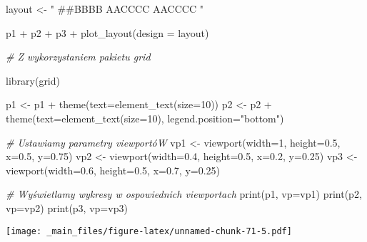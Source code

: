 \documentclass[
]{book}
\newenvironment{Shaded}{\begin{snugshade}}{\end{snugshade}}
\newcommand{\AttributeTok}[1]{\textcolor[rgb]{0.77,0.63,0.00}{#1}}
\newcommand{\CommentTok}[1]{\textcolor[rgb]{0.56,0.35,0.01}{\textit{#1}}}
\newcommand{\DecValTok}[1]{\textcolor[rgb]{0.00,0.00,0.81}{#1}}
\newcommand{\FloatTok}[1]{\textcolor[rgb]{0.00,0.00,0.81}{#1}}
\newcommand{\FunctionTok}[1]{\textcolor[rgb]{0.00,0.00,0.00}{#1}}
\newcommand{\NormalTok}[1]{#1}
\newcommand{\OtherTok}[1]{\textcolor[rgb]{0.56,0.35,0.01}{#1}}
\newcommand{\SpecialCharTok}[1]{\textcolor[rgb]{0.00,0.00,0.00}{#1}}
\newcommand{\StringTok}[1]{\textcolor[rgb]{0.31,0.60,0.02}{#1}}
\begin{document}
\begin{Shaded}
\begin{Highlighting}[]
\NormalTok{layout }\OtherTok{\textless{}{-}} \StringTok{"}
\StringTok{\#\#BBBB}
\StringTok{AACCCC}
\StringTok{AACCCC}
\StringTok{"}

\NormalTok{p1 }\SpecialCharTok{+}\NormalTok{ p2 }\SpecialCharTok{+}\NormalTok{ p3 }\SpecialCharTok{+} 
  \FunctionTok{plot\_layout}\NormalTok{(}\AttributeTok{design =}\NormalTok{ layout)}

\CommentTok{\# Z wykorzystaniem pakietu grid}

\FunctionTok{library}\NormalTok{(grid)}

\NormalTok{p1 }\OtherTok{\textless{}{-}}\NormalTok{ p1 }\SpecialCharTok{+} \FunctionTok{theme}\NormalTok{(}\AttributeTok{text=}\FunctionTok{element\_text}\NormalTok{(}\AttributeTok{size=}\DecValTok{10}\NormalTok{))}
\NormalTok{p2 }\OtherTok{\textless{}{-}}\NormalTok{ p2 }\SpecialCharTok{+} \FunctionTok{theme}\NormalTok{(}\AttributeTok{text=}\FunctionTok{element\_text}\NormalTok{(}\AttributeTok{size=}\DecValTok{10}\NormalTok{), }\AttributeTok{legend.position=}\StringTok{"bottom"}\NormalTok{)}

\CommentTok{\# Ustawiamy parametry viewportóW}
\NormalTok{vp1 }\OtherTok{\textless{}{-}} \FunctionTok{viewport}\NormalTok{(}\AttributeTok{width=}\DecValTok{1}\NormalTok{, }\AttributeTok{height=}\FloatTok{0.5}\NormalTok{, }\AttributeTok{x=}\FloatTok{0.5}\NormalTok{, }\AttributeTok{y=}\FloatTok{0.75}\NormalTok{)}
\NormalTok{vp2 }\OtherTok{\textless{}{-}} \FunctionTok{viewport}\NormalTok{(}\AttributeTok{width=}\FloatTok{0.4}\NormalTok{, }\AttributeTok{height=}\FloatTok{0.5}\NormalTok{, }\AttributeTok{x=}\FloatTok{0.2}\NormalTok{, }\AttributeTok{y=}\FloatTok{0.25}\NormalTok{)}
\NormalTok{vp3 }\OtherTok{\textless{}{-}} \FunctionTok{viewport}\NormalTok{(}\AttributeTok{width=}\FloatTok{0.6}\NormalTok{, }\AttributeTok{height=}\FloatTok{0.5}\NormalTok{, }\AttributeTok{x=}\FloatTok{0.7}\NormalTok{, }\AttributeTok{y=}\FloatTok{0.25}\NormalTok{)}

\CommentTok{\# Wyświetlamy wykresy w ospowiednich viewportach}
\FunctionTok{print}\NormalTok{(p1, }\AttributeTok{vp=}\NormalTok{vp1)}
\FunctionTok{print}\NormalTok{(p2, }\AttributeTok{vp=}\NormalTok{vp2)}
\FunctionTok{print}\NormalTok{(p3, }\AttributeTok{vp=}\NormalTok{vp3)}
\end{Highlighting}
\end{Shaded}

\texttt{[image: \_main\_files/figure-latex/unnamed-chunk-71-5.pdf]}
\end{document}
